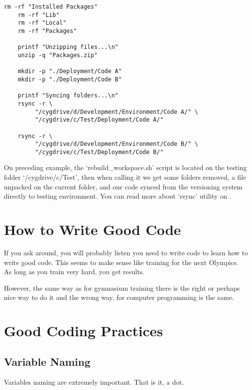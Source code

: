 \begin{englishtext}
\begin{lstlisting}[caption={rebuild\_workspace.sh}]
    rm -rf "Installed Packages"
    rm -rf "Lib"
    rm -rf "Local"
    rm -rf "Packages"

    printf "Unzipping files...\n"
    unzip -q "Packages.zip"

    mkdir -p "./Deployment/Code A"
    mkdir -p "./Deployment/Code B"

    printf "Syncing folders...\n"
    rsync -r \
         "/cygdrive/d/Development/Environment/Code A/" \
         "/cygdrive/c/Test/Deployment/Code A/"

    rsync -r \
         "/cygdrive/d/Development/Environment/Code B/" \
         "/cygdrive/c/Test/Deployment/Code B/"
    \end{lstlisting}
    \vspace*{-4mm}

    On preceding example, the `rebuild\_workspace.sh' script is located on the
    testing folder `/cygdrive/c/Test', then when calling it we get some folders
    removed, a file unpacked on the current folder, and our code synced from the
    versioning system directly to testing environment. You can read more about
    `rsync' utility on \citeonline{synchronizingFolders}.



    \section{How to Write Good Code}

    If you ask around, you will probably listen you need to write code to learn
    how to write good code. This seems to make sense like training for the next
    Olympics. As long as you train very hard, you get results.

    However, the same way as for gymnasium training there is the right or
    perhaps nice way to do it and the wrong way, for computer programming is the
    same.


    \section{Good Coding Practices}


    \subsection{Variable Naming}

    Variables naming are extremely important. That is it, a dot.

    \begin{itemize}


\end{itemize}
\end{englishtext}
